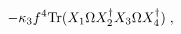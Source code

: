 \begin{equation}
\label{eq:omega4}
- \kappa_3 f^4 {\rm Tr}(X_1 \Omega X_2^\dagger X_3 \Omega
X_4^\dagger) \;, 
\end{equation} 
